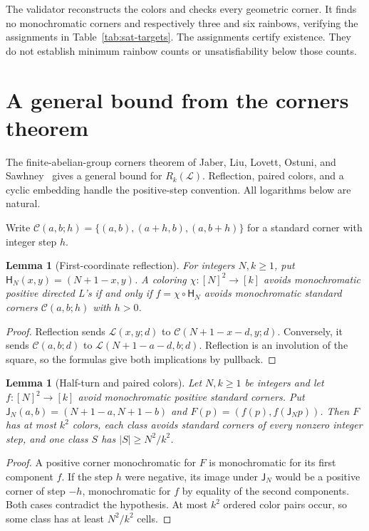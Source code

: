\documentclass[11pt,a4paper]{article}
\newtheorem{lemma}[theorem]{Lemma}
\theoremstyle{definition}
\newcommand{\Lconf}{\mathcal L}
\numberwithin{equation}{section}
\begin{document}
The validator reconstructs the colors and checks every geometric corner. It finds no monochromatic corners and respectively three and six rainbows, verifying the assignments in Table~\ref{tab:sat-targets}. The assignments certify existence. They do not establish minimum rainbow counts or unsatisfiability below those counts.


\section{A general bound from the corners theorem}\label{sec:general}
The finite-abelian-group corners theorem of Jaber, Liu, Lovett, Ostuni, and Sawhney~\cite{JLLOS25} gives a general bound for $R_k(\Lconf)$. Reflection, paired colors, and a cyclic embedding handle the positive-step convention. All logarithms below are natural.

Write $\mathcal C(a,b;h)=\{(a,b),(a+h,b),(a,b+h)\}$ for a standard corner with integer step $h$.

\begin{lemma}[First-coordinate reflection]\label{lem:H}
	For integers $N,k\ge1$, put $\mathsf H_N(x,y)=(N+1-x,y)$. A coloring $\chi:[N]^2\to[k]$ avoids monochromatic positive directed L's if and only if $f=\chi\circ\mathsf H_N$ avoids monochromatic standard corners $\mathcal C(a,b;h)$ with $h>0$.
\end{lemma}
\begin{proof}
	Reflection sends $\Lconf(x,y;d)$ to $\mathcal C(N+1-x-d,y;d)$. Conversely, it sends $\mathcal C(a,b;d)$ to $\Lconf(N+1-a-d,b;d)$. Reflection is an involution of the square, so the formulas give both implications by pullback.
\end{proof}

\begin{lemma}[Half-turn and paired colors]\label{lem:J}
	Let $N,k\ge1$ be integers and let $f:[N]^2\to[k]$ avoid monochromatic positive standard corners. Put $\mathsf J_N(a,b)=(N+1-a,N+1-b)$ and $F(p)=(f(p),f(\mathsf J_Np))$. Then $F$ has at most $k^2$ colors, each class avoids standard corners of every nonzero integer step, and one class $S$ has $|S|\ge N^2/k^2$.
\end{lemma}
\begin{proof}
	A positive corner monochromatic for $F$ is monochromatic for its first component $f$. If the step $h$ were negative, its image under $\mathsf J_N$ would be a positive corner of step $-h$, monochromatic for $f$ by equality of the second components. Both cases contradict the hypothesis. At most $k^2$ ordered color pairs occur, so some class has at least $N^2/k^2$ cells.
\end{proof}
\end{document}
